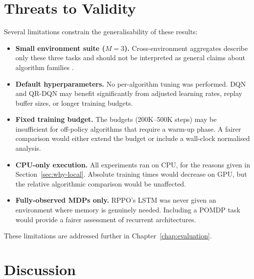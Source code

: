 {\color{red} \section{Threats to Validity}}
\label{sec:threats}

Several limitations constrain the generalisability of these results:
\begin{itemize}
  \item \textbf{Small environment suite ($M = 3$).} Cross-environment
        aggregates describe only these three tasks and should not be
        interpreted as general claims about algorithm families
        \citep{agarwal2021precipice, patterson2024edrl}.
  \item \textbf{Default hyperparameters.} No per-algorithm tuning was
        performed. DQN and QR-DQN may benefit significantly from adjusted
        learning rates, replay buffer sizes, or longer training budgets.
  \item \textbf{Fixed training budget.} The budgets (200K--500K steps)
        may be insufficient for off-policy algorithms that require a
        warm-up phase. A fairer comparison would either extend the budget
        or include a wall-clock normalised analysis.
  \item \textbf{CPU-only execution.} All experiments ran on CPU, for the reasons given in Section~\ref{sec:why-local}. Absolute training times would decrease on GPU, but the relative algorithmic comparison would be unaffected.
  \item \textbf{Fully-observed MDPs only.} RPPO's LSTM was never given
        an environment where memory is genuinely needed. Including a
        POMDP task would provide a fairer assessment of recurrent
        architectures.
\end{itemize}

These limitations are addressed further in Chapter~\ref{chap:evaluation}.

\section{Discussion}
\label{sec:discussion}

